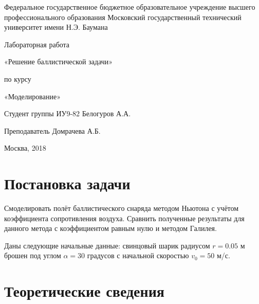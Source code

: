 \documentclass[a4paper, 12pt]{article}   	%
\begin{document}
\begin{titlepage}

\thispagestyle{empty}

\begin{center}
Федеральное государственное бюджетное образовательное учреждение высшего профессионального образования Московский государственный технический университет имени Н.Э. Баумана
\end{center}


\vfill

\centerline{\large{Лабораторная работа}}

\centerline{\large{«Решение баллистической задачи»}}

\centerline{\large{по курсу}}
\centerline{\large{«Моделирование»}}


\vfill

Студент группы ИУ9-82 \hfill Белогуров А.А.

Преподаватель \hfill Домрачева А.Б.
\vfill

\centerline{Москва, 2018}
\clearpage
\end{titlepage}

\newpage
\setcounter{page}{2}

\tableofcontents

\newpage

\section{Постановка задачи}
    Смоделировать полёт баллистического снаряда методом Ньютона с учётом коэффициента сопротивления воздуха. Сравнить полученные результаты для данного метода с коэффициентом равным нулю и методом Галилея.
    
    Даны следующие начальные данные: свинцовый шарик радиусом $r = 0.05$ м брошен под углом $\alpha = 30$ градусов с начальной скоростью $v_0 = 50$ м/с.
    

\newpage

\section{Теоретические сведения}
\end{document}
